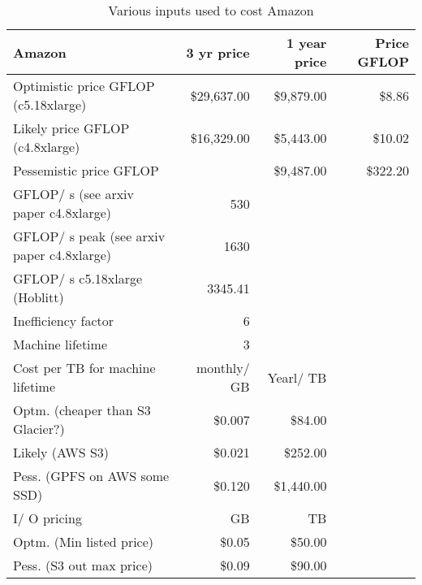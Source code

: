 \tiny \begin{longtable} { |p{}  |r  |r  |r |} 
\caption{Various inputs used to cost Amazon \label{tab:AmazonInputs}}\\ 
\hline 
{Amazon }&{3 yr price}&{1 year price}&{Price GFLOP} \\ \hline
{Optimistic price GFLOP (c5.18xlarge)}&{\$29,637.00}&{\$9,879.00}&{\$8.86} \\ \hline
{Likely price GFLOP (c4.8xlarge)}&{\$16,329.00}&{\$5,443.00}&{\$10.02} \\ \hline
{Pessemistic price GFLOP}&{}&{\$9,487.00}&{\$322.20} \\ \hline
{GFLOP/ s (see arxiv paper c4.8xlarge)}&{530}&& \\ \hline
{GFLOP/ s peak (see arxiv paper c4.8xlarge)}&{1630}&& \\ \hline
{GFLOP/ s c5.18xlarge (Hoblitt)}&{3345.41}&& \\ \hline
{Inefficiency factor}&{6}&& \\ \hline
{Machine lifetime}&{3}&& \\ \hline
{Cost per TB for machine lifetime}&{monthly/ GB}&{Yearl/ TB}& \\ \hline
{Optm. (cheaper than S3 Glacier?) }&{\$0.007}&{\$84.00}& \\ \hline
{Likely (AWS S3)}&{\$0.021}&{\$252.00}& \\ \hline
{Pess. (GPFS on AWS some SSD) }&{\$0.120}&{\$1,440.00}& \\ \hline
{I/ O pricing }&{GB}&{TB }& \\ \hline
{Optm. (Min listed price)}&{\$0.05}&{\$50.00}& \\ \hline
{Pess. (S3 out max price)}&{\$0.09}&{\$90.00}& \\ \hline
\end{longtable} \normalsize
